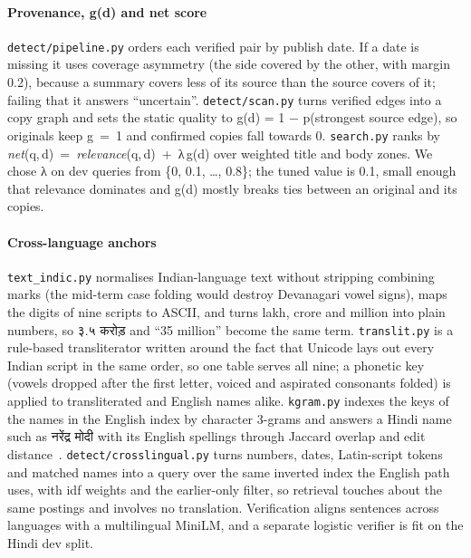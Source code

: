 \documentclass[11pt,a4paper]{article}
\newcommand{\hi}[1]{{\devfont #1}}
\newcommand{\code}[1]{\texttt{#1}}
\begin{document}
\paragraph{Provenance, g(d) and net score} \code{detect/pipeline.py} orders each verified pair by publish date. If a date is missing it uses coverage asymmetry (the side covered by the other, with margin 0.2), because a summary covers less of its source than the source covers of it; failing that it answers ``uncertain''. \code{detect/scan.py} turns verified edges into a copy graph and sets the static quality to g(d) = 1 − p(strongest source edge), so originals keep g~=~1 and confirmed copies fall towards 0. \code{search.py} ranks by \textit{net}(q,\,d)~=~\textit{relevance}(q,\,d)~+~λ\,g(d) over weighted title and body zones. We chose λ on dev queries from \{0, 0.1, \ldots, 0.8\}; the tuned value is 0.1, small enough that relevance dominates and g(d) mostly breaks ties between an original and its copies.

\paragraph{Cross-language anchors} \code{text\_indic.py} normalises Indian-language text without stripping combining marks (the mid-term case folding would destroy Devanagari vowel signs), maps the digits of nine scripts to ASCII, and turns lakh, crore and million into plain numbers, so \hi{३.५ करोड़} and ``35 million'' become the same term. \code{translit.py} is a rule-based transliterator written around the fact that Unicode lays out every Indian script in the same order, so one table serves all nine; a phonetic key (vowels dropped after the first letter, voiced and aspirated consonants folded) is applied to transliterated and English names alike. \code{kgram.py} indexes the keys of the names in the English index by character 3-grams and answers a Hindi name such as \hi{नरेंद्र मोदी} with its English spellings through Jaccard overlap and edit distance~\cite[ch.~3]{iir2008}. \code{detect/crosslingual.py} turns numbers, dates, Latin-script tokens and matched names into a query over the same inverted index the English path uses, with idf weights and the earlier-only filter, so retrieval touches about the same postings and involves no translation. Verification aligns sentences across languages with a multilingual MiniLM, and a separate logistic verifier is fit on the Hindi dev split.
\end{document}
